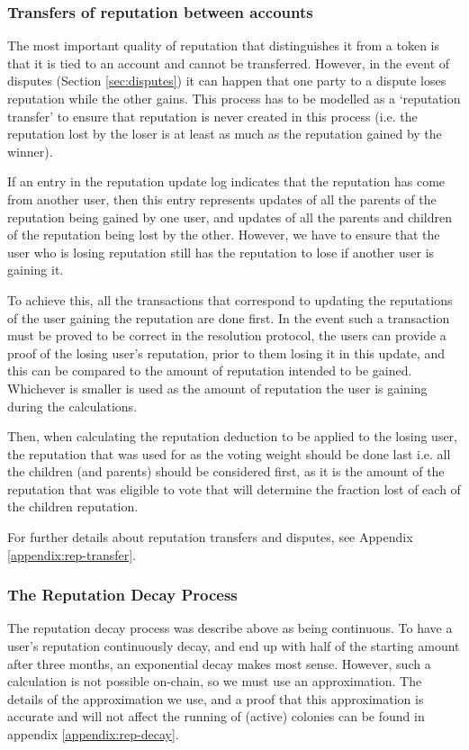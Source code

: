 \subsubsection{Transfers of reputation between accounts}\label{sec:reptransfer}

The most important quality of reputation that distinguishes it from a token is that it is tied to an account and cannot be transferred. However, in the event of disputes (Section \ref{sec:disputes}) it can happen that one party to a dispute loses reputation while the other gains. This process has to be modelled as a `reputation transfer' to ensure that reputation is never created in this process (i.e. the reputation lost by the loser is at least as much as the reputation gained by the winner).

If an entry in the reputation update log indicates that the reputation has come from another user, then this entry represents updates of all the parents of the reputation being gained by one user, and updates of all the parents and children of the reputation being lost by the other. However, we have to ensure that the user who is losing reputation still has the reputation to lose if another user is gaining it.

To achieve this, all the transactions that correspond to updating the reputations of the user gaining the reputation are done first. In the event such a transaction must be proved to be correct in the resolution protocol, the users can provide a proof of the losing user’s reputation, prior to them losing it in this update, and this can be compared to the amount of reputation intended to be gained. Whichever is smaller is used as the amount of reputation the user is gaining during the calculations.

Then, when calculating the reputation deduction to be applied to the losing user, the reputation that was used for as the voting weight should be done last i.e. all the children (and parents) should be considered first, as it is the amount of the reputation that was eligible to vote that will determine the fraction lost of each of the children reputation. %

For further details about reputation transfers and disputes, see Appendix \ref{appendix:rep-transfer}.

\subsubsection{The Reputation Decay Process}\label{sec:repdecay}
The reputation decay process was describe above as being continuous. To have a user's reputation continuously decay, and end up with half of the starting amount after three months, an exponential decay makes most sense. However, such a calculation is not possible on-chain, so we must use an approximation. The details of the approximation we use, and a proof that this approximation is accurate and will not affect the running of (active) colonies can be found in appendix \ref{appendix:rep-decay}.


